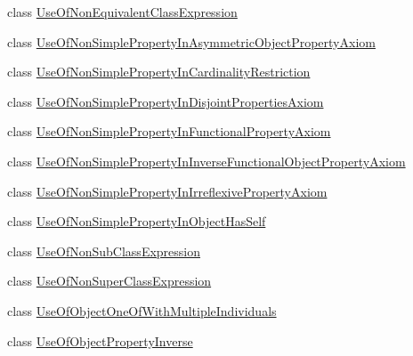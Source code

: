 \begin{DoxyCompactItemize}
class \hyperlink{classorg_1_1semanticweb_1_1owlapi_1_1profiles_1_1_use_of_non_equivalent_class_expression}{Use\-Of\-Non\-Equivalent\-Class\-Expression}
\item 
class \hyperlink{classorg_1_1semanticweb_1_1owlapi_1_1profiles_1_1_use_of_non_simple_property_in_asymmetric_object_property_axiom}{Use\-Of\-Non\-Simple\-Property\-In\-Asymmetric\-Object\-Property\-Axiom}
\item 
class \hyperlink{classorg_1_1semanticweb_1_1owlapi_1_1profiles_1_1_use_of_non_simple_property_in_cardinality_restriction}{Use\-Of\-Non\-Simple\-Property\-In\-Cardinality\-Restriction}
\item 
class \hyperlink{classorg_1_1semanticweb_1_1owlapi_1_1profiles_1_1_use_of_non_simple_property_in_disjoint_properties_axiom}{Use\-Of\-Non\-Simple\-Property\-In\-Disjoint\-Properties\-Axiom}
\item 
class \hyperlink{classorg_1_1semanticweb_1_1owlapi_1_1profiles_1_1_use_of_non_simple_property_in_functional_property_axiom}{Use\-Of\-Non\-Simple\-Property\-In\-Functional\-Property\-Axiom}
\item 
class \hyperlink{classorg_1_1semanticweb_1_1owlapi_1_1profiles_1_1_use_of_non_simple_property_in_inverse_functional_object_property_axiom}{Use\-Of\-Non\-Simple\-Property\-In\-Inverse\-Functional\-Object\-Property\-Axiom}
\item 
class \hyperlink{classorg_1_1semanticweb_1_1owlapi_1_1profiles_1_1_use_of_non_simple_property_in_irreflexive_property_axiom}{Use\-Of\-Non\-Simple\-Property\-In\-Irreflexive\-Property\-Axiom}
\item 
class \hyperlink{classorg_1_1semanticweb_1_1owlapi_1_1profiles_1_1_use_of_non_simple_property_in_object_has_self}{Use\-Of\-Non\-Simple\-Property\-In\-Object\-Has\-Self}
\item 
class \hyperlink{classorg_1_1semanticweb_1_1owlapi_1_1profiles_1_1_use_of_non_sub_class_expression}{Use\-Of\-Non\-Sub\-Class\-Expression}
\item 
class \hyperlink{classorg_1_1semanticweb_1_1owlapi_1_1profiles_1_1_use_of_non_super_class_expression}{Use\-Of\-Non\-Super\-Class\-Expression}
\item 
class \hyperlink{classorg_1_1semanticweb_1_1owlapi_1_1profiles_1_1_use_of_object_one_of_with_multiple_individuals}{Use\-Of\-Object\-One\-Of\-With\-Multiple\-Individuals}
\item 
class \hyperlink{classorg_1_1semanticweb_1_1owlapi_1_1profiles_1_1_use_of_object_property_inverse}{Use\-Of\-Object\-Property\-Inverse}

\end{DoxyCompactItemize}
